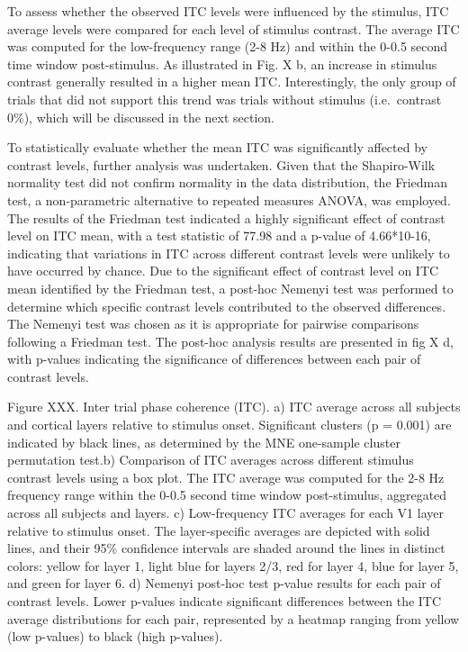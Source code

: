 \documentclass[
  letterpaper,
  DIV=11,
  numbers=noendperiod]{scrartcl}
\begin{document}
To assess whether the observed ITC levels were influenced by the
stimulus, ITC average levels were compared for each level of stimulus
contrast. The average ITC was computed for the low-frequency range (2-8
Hz) and within the 0-0.5 second time window post-stimulus. As
illustrated in Fig. X b, an increase in stimulus contrast generally
resulted in a higher mean ITC. Interestingly, the only group of trials
that did not support this trend was trials without stimulus
(i.e.~contrast 0\%), which will be discussed in the next section.

To statistically evaluate whether the mean ITC was significantly
affected by contrast levels, further analysis was undertaken. Given that
the Shapiro-Wilk normality test did not confirm normality in the data
distribution, the Friedman test, a non-parametric alternative to
repeated measures ANOVA, was employed. The results of the Friedman test
indicated a highly significant effect of contrast level on ITC mean,
with a test statistic of 77.98 and a p-value of 4.66*10-16, indicating
that variations in ITC across different contrast levels were unlikely to
have occurred by chance. Due to the significant effect of contrast level
on ITC mean identified by the Friedman test, a post-hoc Nemenyi test was
performed to determine which specific contrast levels contributed to the
observed differences. The Nemenyi test was chosen as it is appropriate
for pairwise comparisons following a Friedman test. The post-hoc
analysis results are presented in fig X d, with p-values indicating the
significance of differences between each pair of contrast levels.

Figure XXX. Inter trial phase coherence (ITC). a) ITC average across all
subjects and cortical layers relative to stimulus onset. Significant
clusters (p = 0.001) are indicated by black lines, as determined by the
MNE one-sample cluster permutation test.b) Comparison of ITC averages
across different stimulus contrast levels using a box plot. The ITC
average was computed for the 2-8 Hz frequency range within the 0-0.5
second time window post-stimulus, aggregated across all subjects and
layers. c) Low-frequency ITC averages for each V1 layer relative to
stimulus onset. The layer-specific averages are depicted with solid
lines, and their 95\% confidence intervals are shaded around the lines
in distinct colors: yellow for layer 1, light blue for layers 2/3, red
for layer 4, blue for layer 5, and green for layer 6. d) Nemenyi
post-hoc test p-value results for each pair of contrast levels. Lower
p-values indicate significant differences between the ITC average
distributions for each pair, represented by a heatmap ranging from
yellow (low p-values) to black (high p-values).
\end{document}
